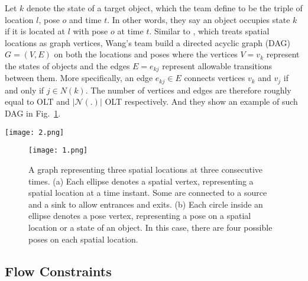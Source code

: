 \documentclass[10pt,twocolumn,letterpaper]{article}
\begin{document}
Let $k$ denote the state of a target object, which the team define to be the triple of location $l$, pose $o$ and time $t$. In other words, they say an object occupies state $k$ if it is located at $l$ with pose $o$ at time $t$. Similar to \cite{Berclaz2011Multiple}, which treats spatial locations as graph vertices, Wang's team build a directed acyclic graph (DAG) $G=(V,E)$ on both the locations and poses where the vertices $V={v_k}$ represent the states of objects and the edges $E={e_{kj}}$ represent allowable transitions between them. More specifically, an edge $e_{kj}\in E$ connects vertices $v_k$ and $v_j$ if and only if $j\in N(k)$. The number of vertices and edges are therefore roughly equal to OLT and $|\mathcal{N}(.)|$ OLT respectively. And they show an example of such DAG in Fig.~\ref{p1}.
\begin{figure*}
	\begin{center}
		\texttt{[image: 2.png]}
	\end{center}
	\caption{Tracking results on five representative subsequences taken from our datasets. Top row. Sample frames with the detected container objects highlighted with circles and containee ones with dots. Bottom Row. Corresponding color-coded top-view trajectories for interacting objects in the scene. The arrows indicate the traversal direction and the numbers on the top-right corners are the frame indices. Note that, in the FIBA case and the ISSIA case, even though there are many players in the field, we plot only two trajectories: one for the ball and the other one for the player in possession of the ball.}
	\label{p2}
\end{figure*}
\begin{figure}
	\begin{center}
		\texttt{[image: 1.png]}
	\end{center}
	\caption{A graph representing three spatial locations at three consecutive times. (a) Each ellipse denotes a spatial vertex, representing a spatial location at a time instant. Some are connected to a source and a sink to allow entrances and exits. (b) Each circle inside an ellipse denotes a pose vertex, representing a pose on a spatial location or a state of an object. In this case, there are four possible poses on each spatial location.}
	\label{p1}
\end{figure}

\subsection{Flow Constraints}
\end{document}
